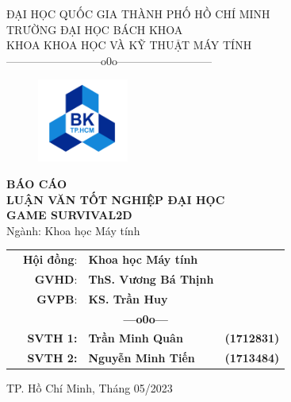 \documentclass[12pt,a4paper]{article}
\begin{document}
  \begin{titlepage}
    \thisfancypage{
      \doublebox}{}
    \begin{center}
    {\fontsize{15pt}{15pt}\selectfont
        ĐẠI HỌC QUỐC GIA THÀNH PHỐ HỒ CHÍ MINH\\
        TRƯỜNG ĐẠI HỌC BÁCH KHOA\\
        KHOA KHOA HỌC VÀ KỸ THUẬT MÁY TÍNH\\
        --------------------------o0o--------------------------
      }
    \end{center}
    \vspace{1cm}
    \begin{figure}[h!]
      \centering
      \includegraphics[width=3cm]{Img/Logo_BK.png}
    \end{figure}
    \vspace{1cm}
    \begin{center}
      \textbf{\fontsize{16pt}{16pt}\selectfont BÁO CÁO\\}
      \textbf{\fontsize{16pt}{16pt}\selectfont LUẬN VĂN TỐT NGHIỆP ĐẠI HỌC\\}
      \vspace{1cm}
      \textbf{\fontsize{25pt}{25pt}\selectfont GAME SURVIVAL2D\\}
      \vspace{1cm}
      \fontsize{15pt}{15pt}\selectfont Ngành: Khoa học Máy tính\\
    \end{center}
    \vspace{1cm}
    \begin{table}[h]
      \centering
      \fontsize{15pt}{15pt}\selectfont
      \begin{tabular}{rrll}
        & \textbf{Hội đồng}: & \textbf{Khoa học Máy tính} & \\
        & \textbf{GVHD}: & \textbf{ThS. Vương Bá Thịnh} & \\
        & \textbf{GVPB}: & \textbf{KS. Trần Huy} & \\
        \multicolumn{4}{c}{\textbf{---o0o---}} \\
        & \textbf{SVTH 1:} & \textbf{Trần Minh Quân} & \textbf{(1712831)} \\
        & \textbf{SVTH 2:} & \textbf{Nguyễn Minh Tiến} & \textbf{(1713484)} \\
      \end{tabular}
    \end{table}
    \vspace{3cm}
    \begin{center}
      {\fontsize{15pt}{15pt}\selectfont TP. Hồ Chí Minh, Tháng 05/2023}
    \end{center}
  \end{titlepage}
  \restoregeometry
\end{document}
